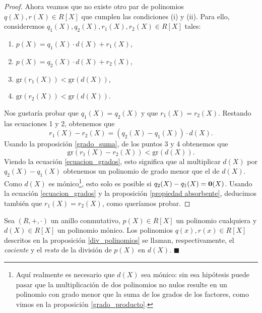 \begin{proof}
Ahora veamos que no existe otro par de polinomios $q(X), r(X) \in R[X]$ que cumplen las condiciones (i) y (ii). Para ello, consideremos $q_1(X), q_2(X), r_1(X), r_2(X) \in R[X]$ tales:
\begin{enumerate}
\item $p(X) = q_1(X) \cdot d(X) + r_1(X)$,
\item $p(X) = q_2(X) \cdot d(X) + r_2(X)$,
\item $\mathrm{gr}(r_1(X)) < \mathrm{gr}(d(X))$,
\item $\mathrm{gr}(r_2(X)) < \mathrm{gr}(d(X))$.
\end{enumerate}
Nos gustaría probar que $q_1(X) = q_2(X)$ y que $r_1(X) = r_2(X)$. Restando las ecuaciones 1 y 2, obtenemos que
\begin{equation} \tag{5} \label{ecuacion_grados}
r_1(X) - r_2(X) = (q_2(X) - q_1(X)) \cdot d(X).
\end{equation}
Usando la proposición \ref{grado_suma}, de los puntos 3 y 4 obtenemos que
$$\mathrm{gr}(r_1(X) - r_2(X)) < \mathrm{gr}(d(X)).$$
Viendo la ecuación \ref{ecuacion_grados}, esto significa que al multiplicar $d(X)$ por $q_2(X)-q_1(X)$ obtenemos un polinomio de grado menor que el de $d(X)$. Como $d(X)$ es mónico\footnote{Aquí realmente es necesario que $d(X)$ sea mónico: sin esa hipótesis puede pasar que la multiplicación de dos polinomios no nulos resulte en un polinomio con grado menor que la suma de los grados de los factores, como vimos en la proposición \ref{grado_producto}.}, esto solo es posible si $q_2(X) - q_1(X) = \mathbf{0}(X)$. Usando la ecuación \ref{ecuacion_grados} y la proposición \ref{propiedad absorbente}, deducimos también que $r_1(X) = r_2(X)$, como queríamos probar.
\end{proof}

\begin{definition}
    Sea $(R, +, \cdot)$ un anillo conmutativo, ${p(X) \in R[X]}$ un polinomio cualquiera y $d(X) \in R[X]$ un polinomio mónico. Los polinomios $q(x), r(x) \in R[X]$ descritos en la proposición \ref{div_polinomios} se llaman, respectivamente, el \emph{cociente} y el \emph{resto} de la división de $p(X)$ en $d(X)$. \hfill$\blacksquare$
\end{definition}

